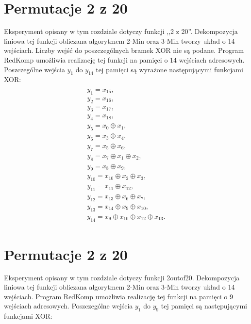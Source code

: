 \section{Permutacje 2 z 20}

Eksperyment opisany w tym rozdziale dotyczy funkcji ,,2 z 20''.
Dekompozycja liniowa tej funkcji obliczana algorytmem 2-Min oraz 3-Min \cite{sasao-s-min} tworzy układ o 14 wejściach.
Liczby wejść do poszczególnych bramek XOR nie są podane.
Program RedKomp umożliwia realizację tej funkcji na pamięci o 14 wejściach adresowych.
Poszczególne wejścia $y_1$ do $y_14$ tej pamięci są wyrażone następującymi funkcjami XOR:
\begin{multline} \\
y_1 = x_{15}, \\
y_2 = x_{16}, \\
y_3 = x_{17}, \\
y_4 = x_{18}, \\
y_5 = x_0 \oplus x_1, \\
y_6 = x_3 \oplus x_4, \\
y_7 = x_5 \oplus x_6, \\
y_8 = x_7 \oplus x_1 \oplus x_2, \\
y_9 = x_8 \oplus x_9, \\
y_{10} = x_{10} \oplus x_2 \oplus x_3, \\
y_{11} = x_{11} \oplus x_{12}, \\
y_{12} = x_{13} \oplus x_6 \oplus x_7, \\
y_{13} = x_{14} \oplus x_9 \oplus x_{10}, \\
y_{14} = x_9 \oplus x_{10} \oplus x_{12} \oplus x_{13}. \\
\end{multline}

\section{Permutacje 2 z 20}

Eksperyment opisany w tym rozdziale dotyczy funkcji 2outof20.
Dekompozycja liniowa tej funkcji obliczana algorytmem 2-Min oraz 3-Min \cite{sasao-s-min} tworzy układ o 14 wejściach.
Program RedKomp umożliwia realizację tej funkcji na pamięci o 9 wejściach adresowych.
Poszczególne wejścia $y_1$ do $y_9$ tej pamięci są następującymi funkcjami XOR:

